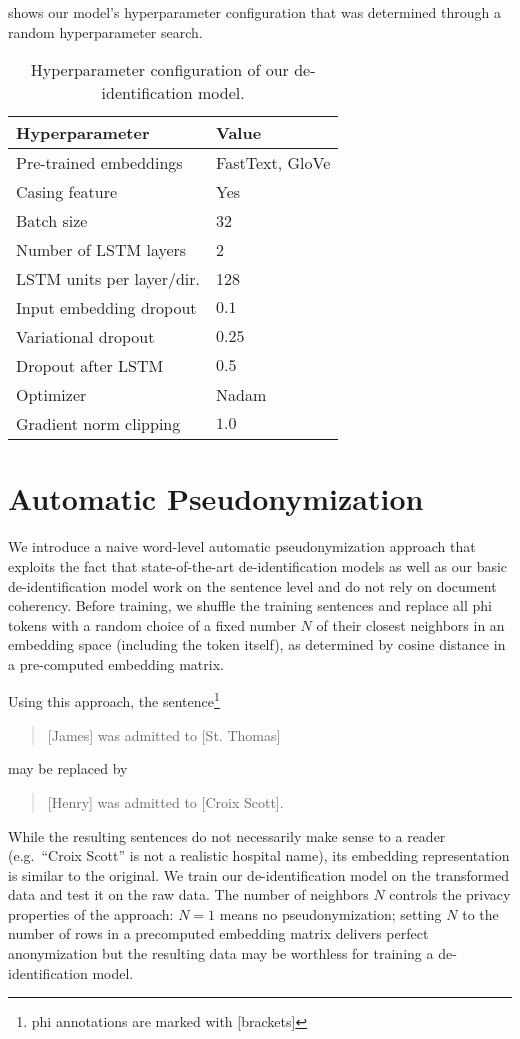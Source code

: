 %
 shows our model's hyperparameter configuration that was determined through a random hyperparameter search.

\begin{table}
    \centering
    \begin{tabular}{ll}
     \toprule
     Hyperparameter & Value\\
     \midrule
     Pre-trained embeddings & FastText, GloVe\\
     Casing feature & Yes\\
     Batch size & 32\\
     Number of LSTM layers & 2\\
     LSTM units per layer/dir. & 128\\
     Input embedding dropout & $0.1$\\
     Variational dropout & $0.25$\\
     Dropout after LSTM & $0.5$\\
     Optimizer & Nadam\\
     Gradient norm clipping & $1.0$\\
     \bottomrule
    \end{tabular}
    \caption{Hyperparameter configuration of our de-identification model.}\label{tab:deid-hyperparameters}
\end{table}


\section{Automatic Pseudonymization}\label{sec:automatic-pseudonymization}
%
We introduce a naive word-level automatic pseudonymization approach that exploits the fact that state-of-the-art de-identification models \citep{liu2017identification,dernoncourt2017identification} as well as our basic de-identification model work on the sentence level and do not rely on document coherency.
%
Before training, we shuffle the training sentences and replace all \ac{phi} tokens with a random choice of a fixed number $N$ of their closest neighbors in an embedding space (including the token itself), as determined by cosine distance in a pre-computed embedding matrix.

%
Using this approach, the sentence\footnote{\ac{phi} annotations are marked with [brackets]}
%
\begin{quote}
    [James] was admitted to [St. Thomas]
\end{quote}
%
may be replaced by
\begin{quote}
    [Henry] was admitted to [Croix Scott].
\end{quote}
%
While the resulting sentences do not necessarily make sense to a reader (e.g.\ ``Croix Scott'' is not a realistic hospital name), its embedding representation is similar to the original.
%
We train our de-identification model on the transformed data and test it on the raw data.
%
The number of neighbors $N$ controls the privacy properties of the approach: $N = 1$ means no pseudonymization; setting $N$ to the number of rows in a precomputed embedding matrix delivers perfect anonymization but the resulting data may be worthless for training a de-identification model.

